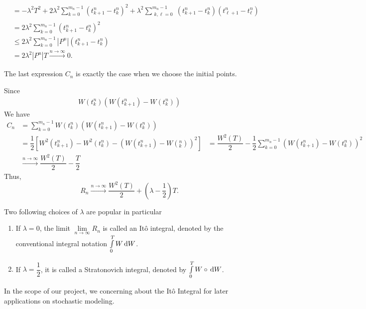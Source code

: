 \begin{solution}
\begin{align*}
     & = -\lambda^2 T^2 + 2\lambda^2\sum\limits_{k=0}^{m_n-1}(t_{k+1}^n-t_k^n)^2 + \lambda^2\sum\limits_{\substack{k,\ell=0}}^{m_n-1} (t_{k+1}^n-t_k^n)(t_{\ell+1}^n-t_\ell^n)                \\
     & = 2\lambda^2\sum\limits_{k=0}^{m_n-1}(t_{k+1}^n-t_k^n)^2                                                                                                                               \\
     & \le 2\lambda^2\sum\limits_{k=0}^{m_n-1}|P^n|(t_{k+1}^n-t_k^n)                                                                                                                          \\
     & = 2\lambda^2|P^n|T \xrightarrow{n\to\infty} 0.
  \end{align*}

  The last expression $C_n$ is exactly the case when we choose the initial points.

  Since
  \begin{align*}
    W(t_k^n)(W(t^n_{k+1})-W(t^n_k))
  \end{align*}
  We have
  \begin{align*}
    C_n
     & =\sum\limits_{k=0}^{m_n-1}W(t^n_k)(W(t^n_{k+1})-W(t^n_k))                          \\
     & = \dfrac{1}{2}\left[W^2(t^n_{k+1})-W^2(t^n_k)-(W(t^n_{k+1})-W(^n_k))^2\right]
     & =\dfrac{W^2(T)}{2} -\dfrac{1}{2}\sum\limits_{k=0}^{m_n-1}(W(t^n_{k+1})-W(t^n_k))^2 \\
     & \xrightarrow{n\to\infty} \dfrac{W^2(T)}{2} - \dfrac{T}{2}
  \end{align*}
  Thus,
  $$R_n \xrightarrow{n\to\infty} \dfrac{W^2(T)}{2} + \left(\lambda-\dfrac{1}{2}\right)T.$$
\end{solution}

Two following choices of $\lambda$ are popular in particular
\begin{enumerate}
  \item If $\lambda = 0$, the limit $\lim\limits_{n\to\infty}R_n$ is called an Itô integral, denoted by the conventional integral notation $\int\limits_0^T W\,\mathrm{d} W$.
  \item If $\lambda = \dfrac{1}{2}$, it is called a Stratonovich integral, denoted by $\int\limits_0^T W\circ\,\mathrm{d} W$.
\end{enumerate}

In the scope of our project, we concerning about the Itô Integral for later applications on stochastic modeling.

